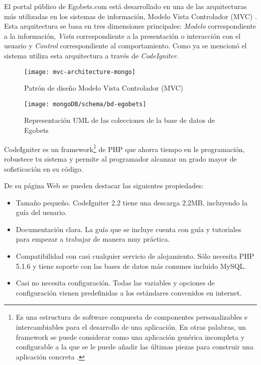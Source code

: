 El portal público de Egobets.com está desarrollado en una de las arquitecturas más utilizadas en los sistemas de información, Modelo Vista Controlador (MVC) \cite{alfredo2005ingenieria}. Esta arquitectura se basa en tres dimensiones principales: \emph{Modelo} correspondiente a la información, \emph{Vista} correspondiente a la presentación o interacción con el usuario y \emph{Control} correspondiente al comportamiento. Como ya se mencionó el sistema utiliza esta arquitectura a través de \emph{CodeIgniter}.

\begin{figure}[!htb]\centering
   \begin {minipage}{1\textwidth}
     \texttt{[image: mvc-architecture-mongo]}
     \caption{Patrón de diseño Modelo Vista Controlador (MVC)}\label{Fig:mvc}
   \end{minipage}
\end{figure}

	\begin{figure}[!htb]\centering
	   \begin {minipage}{1\textwidth}
	     \texttt{[image: mongoDB/schema/bd-egobets]}
	     \caption{Representación UML de las colecciones de la base de datos de Egobets}\label{Fig:db-egobets}
	   \end{minipage}
	\end{figure}
	
CodeIgniter es un framework\footnote{Es una estructura de software compuesta de componentes personalizables e intercambiables para el desarrollo de una aplicación. En otras palabras, un framework se puede considerar como una aplicación genérica incompleta y configurable a la que se le puede añadir las últimas piezas para construir una aplicación concreta \cite{upton2007codeigniter}.} de PHP que ahorra tiempo en le programación, robustece tu sistema y permite al programador alcanzar un grado mayor de sofisticación en su código. 
	
	De su página Web \cite{codeigniterWeb} se pueden destacar las siguientes propiedades:
	\begin{itemize}
		\item Tamaño pequeño. CodeIgniter 2.2 tiene una descarga 2.2MB, incluyendo la guía del usuario.
		\item Documentación clara. La guía que se incluye cuenta con guía y tutoriales para empezar a trabajar de manera muy práctica.
		\item Compatibilidad con casi cualquier servicio de alojamiento. Sólo necesita PHP 5.1.6 y tiene soporte con las bases de datos más comunes incluido MySQL.

		\item Casi no necesita configuración. Todas las variables y opciones de configuración vienen predefinidas a los estándares convenidos en internet.

	\end{itemize}
	


